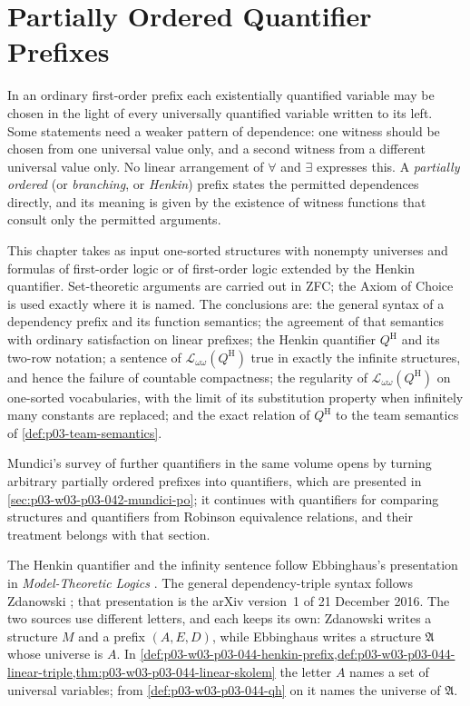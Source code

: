 \chapter{Partially Ordered Quantifier Prefixes}
\label{sec:p03-w03-p03-044-po-prefixes}

In an ordinary first-order prefix each existentially quantified variable may
be chosen in the light of every universally quantified variable written to
its left.  Some statements need a weaker pattern of dependence: one witness
should be chosen from one universal value only, and a second witness from a
different universal value only.  No linear arrangement of \(\forall\) and
\(\exists\) expresses this.  A \emph{partially ordered} (or \emph{branching},
or \emph{Henkin}) prefix states the permitted dependences directly, and its
meaning is given by the existence of witness functions that consult only the
permitted arguments.

This chapter takes as input one-sorted structures with nonempty universes
and formulas of first-order logic or of first-order logic extended by the
Henkin quantifier.  Set-theoretic arguments are carried out in ZFC; the
Axiom of Choice is used exactly where it is named.  The conclusions are:
the general syntax of a dependency prefix and its function semantics; the
agreement of that semantics with ordinary satisfaction on linear prefixes;
the Henkin quantifier \(Q^{\mathrm H}\) and its two-row notation; a
sentence of \(\mathscr L_{\omega\omega}(Q^{\mathrm H})\) true in exactly the
infinite structures, and hence the failure of countable compactness; the
regularity of \(\mathscr L_{\omega\omega}(Q^{\mathrm H})\) on one-sorted
vocabularies, with the limit of its substitution property when infinitely
many constants are replaced; and the exact relation of \(Q^{\mathrm H}\) to the team
semantics of \cref{def:p03-team-semantics}.

Mundici's survey of further quantifiers in the same volume opens by turning
arbitrary partially ordered prefixes into quantifiers, which are
presented in \cref{sec:p03-w03-p03-042-mundici-po}; it continues with
quantifiers for comparing structures and quantifiers from Robinson
equivalence relations, and their treatment belongs with that section.

The Henkin quantifier and the infinity sentence follow
Ebbinghaus's presentation in \emph{Model-Theoretic Logics}
\cite[Ch.~II, Section~2.5, pp.~38--39]{Ebbinghaus1985ExtendedLogics}.
The general dependency-triple syntax follows Zdanowski
\cite[Section~2, pp.~2--3]{Zdanowski2016HenkinArxiv}; that presentation is
the arXiv version~1 of 21 December 2016.  The two sources use different
letters, and each keeps its own: Zdanowski writes a structure \(M\) and a
prefix \((A,E,D)\), while Ebbinghaus writes a structure \(\mathfrak A\) whose
universe is \(A\).  In
\cref{def:p03-w03-p03-044-henkin-prefix,def:p03-w03-p03-044-linear-triple,thm:p03-w03-p03-044-linear-skolem}
the letter \(A\) names a set of universal variables; from
\cref{def:p03-w03-p03-044-qh} on it names the universe of \(\mathfrak A\).

